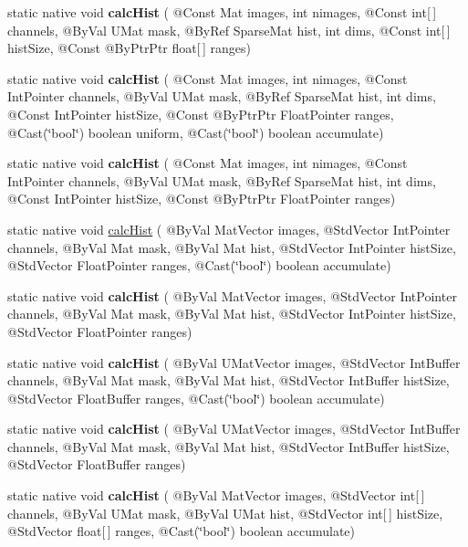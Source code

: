 \begin{DoxyCompactItemize}
\item 
static native void {\bfseries calc\+Hist} ( @Const Mat images, int nimages, @Const int\mbox{[}$\,$\mbox{]} channels, @By\+Val U\+Mat mask, @By\+Ref Sparse\+Mat hist, int dims, @Const int\mbox{[}$\,$\mbox{]} hist\+Size, @Const @By\+Ptr\+Ptr float\mbox{[}$\,$\mbox{]} ranges)
\item 
static native void {\bfseries calc\+Hist} ( @Const Mat images, int nimages, @Const Int\+Pointer channels, @By\+Val U\+Mat mask, @By\+Ref Sparse\+Mat hist, int dims, @Const Int\+Pointer hist\+Size, @Const @By\+Ptr\+Ptr Float\+Pointer ranges, @Cast(\char`\"{}bool\char`\"{}) boolean uniform, @Cast(\char`\"{}bool\char`\"{}) boolean accumulate)
\item 
static native void {\bfseries calc\+Hist} ( @Const Mat images, int nimages, @Const Int\+Pointer channels, @By\+Val U\+Mat mask, @By\+Ref Sparse\+Mat hist, int dims, @Const Int\+Pointer hist\+Size, @Const @By\+Ptr\+Ptr Float\+Pointer ranges)
\item 
static native void \hyperlink{group__imgproc__hist_gaae5adf8a34c06197b68e79d8dcb9c9fd}{calc\+Hist} ( @By\+Val Mat\+Vector images, @Std\+Vector Int\+Pointer channels, @By\+Val Mat mask, @By\+Val Mat hist, @Std\+Vector Int\+Pointer hist\+Size, @Std\+Vector Float\+Pointer ranges, @Cast(\char`\"{}bool\char`\"{}) boolean accumulate)
\item 
static native void {\bfseries calc\+Hist} ( @By\+Val Mat\+Vector images, @Std\+Vector Int\+Pointer channels, @By\+Val Mat mask, @By\+Val Mat hist, @Std\+Vector Int\+Pointer hist\+Size, @Std\+Vector Float\+Pointer ranges)
\item 
static native void {\bfseries calc\+Hist} ( @By\+Val U\+Mat\+Vector images, @Std\+Vector Int\+Buffer channels, @By\+Val Mat mask, @By\+Val Mat hist, @Std\+Vector Int\+Buffer hist\+Size, @Std\+Vector Float\+Buffer ranges, @Cast(\char`\"{}bool\char`\"{}) boolean accumulate)
\item 
static native void {\bfseries calc\+Hist} ( @By\+Val U\+Mat\+Vector images, @Std\+Vector Int\+Buffer channels, @By\+Val Mat mask, @By\+Val Mat hist, @Std\+Vector Int\+Buffer hist\+Size, @Std\+Vector Float\+Buffer ranges)
\item 
static native void {\bfseries calc\+Hist} ( @By\+Val Mat\+Vector images, @Std\+Vector int\mbox{[}$\,$\mbox{]} channels, @By\+Val U\+Mat mask, @By\+Val U\+Mat hist, @Std\+Vector int\mbox{[}$\,$\mbox{]} hist\+Size, @Std\+Vector float\mbox{[}$\,$\mbox{]} ranges, @Cast(\char`\"{}bool\char`\"{}) boolean accumulate)
\item 

\end{DoxyCompactItemize}
